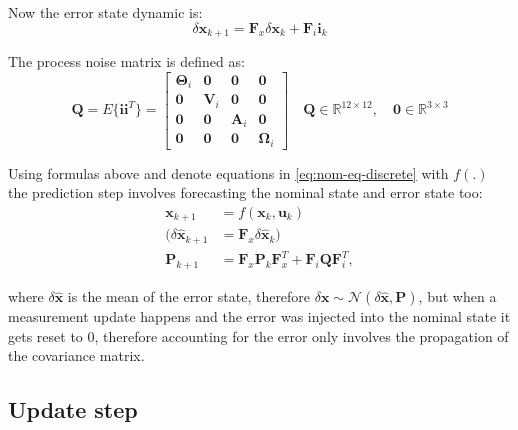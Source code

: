 Now the error state dynamic is:
\begin{equation}
    \delta\mathbf{x}_{k+1}=\mathbf{F}_x\delta\mathbf{x}_k+\mathbf{F}_{i}\mathbf{i}_k
    \label{eq:error-state-dyn}
\end{equation}

The process noise matrix is defined as:
\begin{equation}
    \mathbf{Q}=E\{\mathbf{i}\mathbf{i}^T\}=\begin{bmatrix}
        \boldsymbol{\Theta}_i & \mathbf{0} & \mathbf{0} & \mathbf{0} \\
        \mathbf{0} & \mathbf{V}_i & \mathbf{0} & \mathbf{0} \\
        \mathbf{0} & \mathbf{0} & \mathbf{A}_i & \mathbf{0} \\
        \mathbf{0} & \mathbf{0} & \mathbf{0} & \boldsymbol{\Omega}_i
    \end{bmatrix} \quad \mathbf{Q}\in\mathbb{R}^{12\times 12},\quad \mathbf{0}\in\mathbb{R}^{3\times 3}
\end{equation}

Using formulas above and denote equations in \eqref{eq:nom-eq-discrete} with $f(.)$ the prediction step involves forecasting the nominal state and error state too:
\begin{subequations}
\begin{align}
    \mathbf{x}_{k+1} &= f(\mathbf{x}_k, \mathbf{u}_k) \\
    (\delta\hat{\mathbf{x}}_{k+1} &= \mathbf{F}_x\delta\hat{\mathbf{x}}_k) \label{eq:err-state-dyn}\\
    \mathbf{P}_{k+1} &= \mathbf{F}_x\mathbf{P}_k\mathbf{F}_x^T+ \mathbf{F}_i\mathbf{Q}\mathbf{F}_i^T,
    \label{eq:err-cov-prop}
\end{align}
\end{subequations}

where $\delta\hat{\mathbf{x}}$ is the mean of the error state, therefore $\delta\mathbf{x}\sim\mathcal{N}(\delta\hat{\mathbf{x}},\mathbf{P})$, but when a measurement update happens and the error was injected into the nominal state it gets reset to 0, therefore accounting for the error only involves the propagation of the covariance matrix.

\subsection{Update step}

